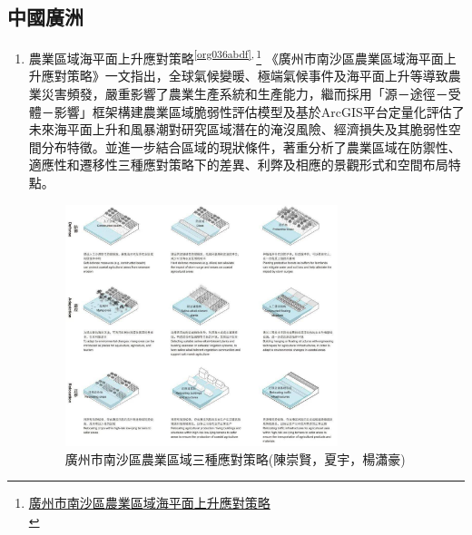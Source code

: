 \documentclass[a4paper,12pt]{article}
\begin{document}
\subsection{中國廣洲}
\label{sec:orgdf3edc6}
\begin{enumerate}
\item 農業區域海平面上升應對策略\textsuperscript{\ref{org036abdf}}\textsuperscript{,}\,\footnote{\href{https://mall.cnki.net/magazine/article/JGSJ202003002.htm}{廣州市南沙區農業區域海平面上升應對策略}\\}
\label{sec:org27dd928}
《廣州市南沙區農業區域海平面上升應對策略》一文指出，全球氣候變暖、極端氣候事件及海平面上升等導致農業災害頻發，嚴重影響了農業生產系統和生產能力，繼而採用「源－途徑－受體－影響」框架構建農業區域脆弱性評估模型及基於ArcGIS平台定量化評估了未來海平面上升和風暴潮對研究區域潛在的淹沒風險、經濟損失及其脆弱性空間分布特徵。並進一步結合區域的現狀條件，著重分析了農業區域在防禦性、適應性和遷移性三種應對策略下的差異、利弊及相應的景觀形式和空間布局特點。\\
\begin{figure}[htbp]
\centering
\includegraphics[width=300]{images/p-KptHMBeElxlkkaDqwK.jpg}
\caption{\label{fig:gg-1}廣州市南沙區農業區域三種應對策略(陳崇賢，夏宇，楊瀟豪)}
\end{figure}
\end{enumerate}
\end{document}
